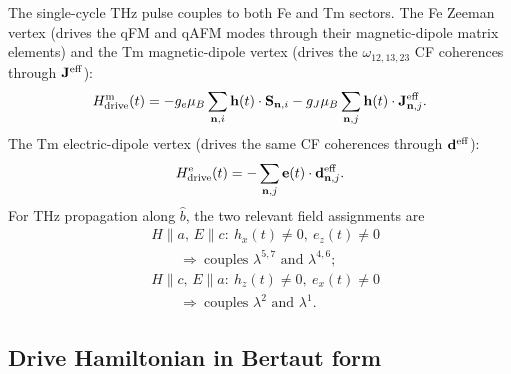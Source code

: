\documentclass[reprint,amsmath,amssymb,aps,prb,longbibliography]{revtex4-2}
\newcommand{\Jeff}{\mathbf{J}^{\rm eff}}
\newcommand{\deff}{\mathbf{d}^{\rm eff}}
\newcommand{\bfS}{\mathbf{S}}
\begin{document}
The single-cycle THz pulse couples to both Fe and Tm sectors. The Fe
Zeeman vertex (drives the qFM and qAFM modes through their magnetic-dipole
matrix elements) and the Tm magnetic-dipole vertex (drives the
$\omega_{12,13,23}$ CF coherences through $\Jeff$):
\begin{equation}
H_{\rm drive}^{\rm m}(t) = -g_e\mu_B\sum_{\mathbf n,i}\mathbf h(t)\cdot\bfS_{\mathbf n,i}
- g_J\mu_B\sum_{\mathbf n,j}\mathbf h(t)\cdot\Jeff_{\mathbf n,j}.
\label{eq:Hdrivem}
\end{equation}
The Tm electric-dipole vertex (drives the same CF coherences through
$\deff$):
\begin{equation}
H_{\rm drive}^{\rm e}(t) = -\sum_{\mathbf n,j}\mathbf e(t)\cdot\deff_{\mathbf n,j}.
\label{eq:Hdrivee}
\end{equation}
For THz propagation along $\hat b$, the two relevant field assignments are
\begin{equation}
\begin{aligned}
&H\!\parallel\! a,\, E\!\parallel\! c:\ h_x(t)\neq 0,\ e_z(t)\neq 0\\
&\qquad\Longrightarrow\ \text{couples }\lambda^{5,7}\text{ and }\lambda^{4,6};\\
&H\!\parallel\! c,\, E\!\parallel\! a:\ h_z(t)\neq 0,\ e_x(t)\neq 0\\
&\qquad\Longrightarrow\ \text{couples }\lambda^2\text{ and }\lambda^1.
\end{aligned}
\label{eq:geometries}
\end{equation}

\subsection{Drive Hamiltonian in Bertaut form}
\label{sec:driveBertaut}
\end{document}
